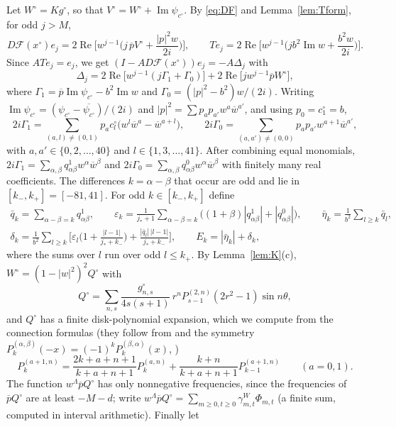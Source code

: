 \documentclass[11pt]{amsart}
\theoremstyle{definition}
\theoremstyle{remark}
\numberwithin{equation}{section}
\newcommand{\Fc}{\mathcal{F}}
\newcommand{\eps}{\varepsilon}
\newcommand{\bw}{\overline{w}}
\newcommand{\jst}{j_*}
\DeclareMathOperator{\re}{Re}
\DeclareMathOperator{\im}{Im}
\begin{document}
Let $W^\circ=Kg^\circ$, so that $V^\circ=W^\circ+\im\psi_{c^\circ}$. By \eqref{eq:DF} and Lemma~\ref{lem:Tform}, for odd $j>M$,
\[
D\Fc(x^\circ)e_j=2\re\Big[w^{j-1}\Big(j\,\overline pV^\circ+\frac{|p|^2w}{2i}\Big)\Big],\qquad Te_j=2\re\Big[w^{j-1}\Big(jb^2\im w+\frac{b^2w}{2i}\Big)\Big].
\]
Since $ATe_j=e_j$, we get $(I-AD\Fc(x^\circ))e_j=-A\Delta_j$ with
\begin{equation}\label{eq:Deltaj}
\Delta_j=2\re\big[w^{j-1}(j\Gamma_1+\Gamma_0)\big]+2\re\big[jw^{j-1}\overline pW^\circ\big],
\end{equation}
where $\Gamma_1=\overline p\im\psi_{c^\circ}-b^2\im w$ and $\Gamma_0=(|p|^2-b^2)w/(2i)$.
Writing $\im\psi_{c^\circ}=(\psi_{c^\circ}-\overline{\psi_{c^\circ}})/(2i)$ and $|p|^2=\sum p_ap_{a'}w^a\bw^{a'}$, and using $p_0=c^\circ_1=b$,
\[
2i\Gamma_1=\sum_{(a,l)\neq(0,1)}p_ac^\circ_l\big(w^l\bw^a-\bw^{a+l}\big),\qquad 2i\Gamma_0=\sum_{(a,a')\neq(0,0)}p_ap_{a'}w^{a+1}\bw^{a'},
\]
with $a,a'\in\{0,2,\ldots,40\}$ and $l\in\{1,3,\ldots,41\}$. After combining equal monomials, $2i\Gamma_1=\sum_{\alpha,\beta}q^1_{\alpha\beta}w^\alpha\bw^\beta$ and $2i\Gamma_0=\sum_{\alpha,\beta}q^0_{\alpha\beta}w^\alpha\bw^\beta$ with finitely many real coefficients. The differences $k=\alpha-\beta$ that occur are odd and lie in $[k_-,k_+]=[-81,41]$. For odd $k\in[k_-,k_+]$ define
\begin{gather*}
\bar q_k=\sum_{\alpha-\beta=k}q^1_{\alpha\beta},\qquad \eps_k=\frac1{\jst+1}\sum_{\alpha-\beta=k}\big((1+\beta)|q^1_{\alpha\beta}|+|q^0_{\alpha\beta}|\big),\qquad \bar\eta_k=\frac1{b^2}\sum_{l\geq k}\bar q_l,\\
\delta_k=\frac1{b^2}\sum_{l\geq k}\Big[\eps_l\Big(1+\frac{|l-1|}{\jst+k_-}\Big)+\frac{|\bar q_l|\,|l-1|}{\jst+k_-}\Big],\qquad E_k=|\bar\eta_k|+\delta_k,
\end{gather*}
where the sums over $l$ run over odd $l\leq k_+$. By Lemma~\ref{lem:K}(c), $W^\circ=(1-|w|^2)^2Q^\circ$ with
\[
Q^\circ=\sum_{n,s}\frac{g^\circ_{n,s}}{4s(s+1)}\,r^nP^{(2,n)}_{s-1}(2r^2-1)\sin n\theta ,
\]
and $Q^\circ$ has a finite disk-polynomial expansion, which we compute from the connection formulas (they follow from \cite[Eq.~18.9.5]{DLMF} and the symmetry $P^{(\alpha,\beta)}_k(-x)=(-1)^kP^{(\beta,\alpha)}_k(x)$, \cite[Table~18.6.1]{DLMF})
\[
P^{(a+1,n)}_k=\frac{2k+a+n+1}{k+a+n+1}P^{(a,n)}_k+\frac{k+n}{k+a+n+1}P^{(a+1,n)}_{k-1}\qquad(a=0,1).
\]
The function $w^\Lambda\overline pQ^\circ$ has only nonnegative frequencies, since the frequencies of $\overline pQ^\circ$ are at least $-M-d$; write $w^\Lambda\overline pQ^\circ=\sum_{m\geq0,t\geq0}\gamma^W_{m,t}\Phi_{m,t}$ (a finite sum, computed in interval arithmetic). Finally let
\end{document}
